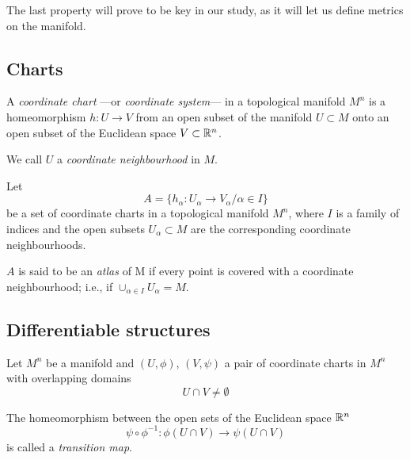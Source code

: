 
The last property will prove to be key in our study, as it will let us define metrics on the manifold.

\subsection{Charts}


\begin{definition}
    A \emph{coordinate chart} ---or \emph{coordinate system}--- in a topological manifold $M^n$ is a homeomorphism $h \colon U \to V$ from an open subset of the manifold $U \subset M$ onto an open subset of the Euclidean space $V \subset \mathbb{R}^n$.

    We call $U$ a \emph{coordinate neighbourhood} in $M$.
\end{definition}

\begin{definition}
    Let
    \[
    A = \{h_\alpha \colon U_\alpha \to V_\alpha / \alpha \in I\}
    \]
    be a set of coordinate charts in a topological manifold $M^n$, where $I$ is a family of indices and the open subsets $U_\alpha \subset M$ are the corresponding coordinate neighbourhoods.

    $A$ is said to be an \emph{atlas} of M if every point is covered with a coordinate neighbourhood; i.e., if $\cup_{\alpha \in I} U_\alpha = M$.
\end{definition}


\subsection{Differentiable structures}

\begin{definition}
    Let $M^n$ be a manifold and $(U, \phi)$, $(V, \psi)$ a pair of coordinate charts in $M^n$ with overlapping domains
    \[
        U \cap V \neq \emptyset
    \]

    The homeomorphism between the open sets of the Euclidean space $\mathbb{R}^n$
    \[
        \psi \circ \phi^{-1} \colon \phi(U \cap V) \to \psi(U \cap V)
    \]
    is called a \emph{transition map}.
\end{definition}

